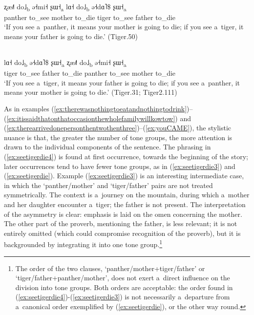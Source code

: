 \begin{exe}
	\ex
	\label{ex:seetigerdie3}
	\\
	\gll ʐæ˩˥			do˩\textsubscript{b}			ə˧mi˧		ʂɯ˧\textsubscript{a}		lɑ˧		do˩\textsubscript{b}		ə˧dɑ˥\$		ʂɯ˧\textsubscript{a}\\
	panther		to\_see	mother		to\_die		tiger			to\_see					father		to\_die\\
	\glt ‘If you see a~panther, it means your mother is going to die; if you see a~tiger, it means your father is going
	to die.’ (Tiger.50)
\end{exe}

\begin{exe}
	\ex
	\label{ex:seetigerdie}
	\\
	\gll lɑ˧		do˩\textsubscript{b}		ə˧dɑ˥\$		ʂɯ˧\textsubscript{a}		ʐæ˩˥			do˩\textsubscript{b}			ə˧mi˧		ʂɯ˧\textsubscript{a}\\
	tiger			to\_see					father		to\_die		panther		to\_see	mother		to\_die\\
	\glt ‘If you see a~tiger, it means your father is going
	to die; if you see a~panther, it means your mother is going to die.’ (Tiger.31; Tiger2.111)
\end{exe}

As in examples (\ref{ex:therewasnothingtoeatandnothingtodrink})--(\ref{ex:itissaidthatonthatoccasionthewholefamilywillkowtow}) and (\ref{ex:therearrivedonepersonthentwothenthree})--(\ref{ex:youCAME}), the stylistic nuance is
that, the greater the number of tone groups, the more attention is drawn to the individual
components of the sentence. The {phrasing} in (\ref{ex:seetigerdie4}) is found at first occurrence, towards the beginning of the story; later occurrences tend to have fewer tone groups, as in (\ref{ex:seetigerdie3}) and (\ref{ex:seetigerdie}). Example (\ref{ex:seetigerdie3}) is an interesting intermediate case, in which the ‘panther/mother’ and ‘tiger/father’ pairs are not treated symmetrically. The context is a~journey on the mountain, during which a~mother and her daughter encounter a~tiger; the father is not present. The interpretation of the asymmetry is clear: emphasis is laid on the omen concerning the mother. The other part of the proverb, mentioning the father, is less relevant; it is not entirely omitted (which could compromise recognition of the proverb), but it is backgrounded by integrating it into one tone group.\footnote{The order of the two clauses, ‘panther/mother+tiger/father’ or ‘tiger/father+panther/mother’, does not exert a~direct influence on the division into tone groups. Both orders are acceptable: the order found in  (\ref{ex:seetigerdie4})-(\ref{ex:seetigerdie3}) is not necessarily a~departure from a~canonical order exemplified by (\ref{ex:seetigerdie}), or the other way round.}

